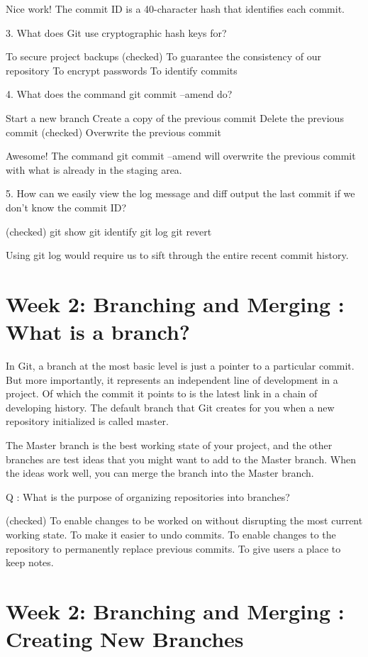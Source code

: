 \documentclass[11pt, onecolumn]{article}
\begin{document}
Nice work! The commit ID is a 40-character hash that identifies each commit.


3. What does Git use cryptographic hash keys for?

To secure project backups
(checked) To guarantee the consistency of our repository
To encrypt passwords
To identify commits


4. What does the command git commit --amend do?

Start a new branch
Create a copy of the previous commit
Delete the previous commit
(checked) Overwrite the previous commit

Awesome! The command git commit --amend will overwrite the previous commit with what is already in the staging area.


5. How can we easily view the log message and diff output the last commit if we don't know the commit ID?

(checked) git show
git identify
git log
git revert 

Using git log would require us to sift through the entire recent commit history.


\section{Week 2: Branching and Merging : What is a branch?}
In Git, a branch at the most basic level is just a pointer to a particular commit.
But more importantly, it represents an independent line of development in a project.
Of which the commit it points to is the latest link in a chain of developing history.
The default branch that Git creates for you when a new repository initialized is called master.

The Master branch is the best working state of your project, and the other branches are test ideas that you might want to add to the Master branch. When the ideas work well, you can merge the branch into the Master branch.

Q : What is the purpose of organizing repositories into branches?

(checked) To enable changes to be worked on without disrupting the most current working state.
To make it easier to undo commits.
To enable changes to the repository to permanently replace previous commits.
To give users a place to keep notes.


\section{Week 2: Branching and Merging : Creating New Branches}
\end{document}
